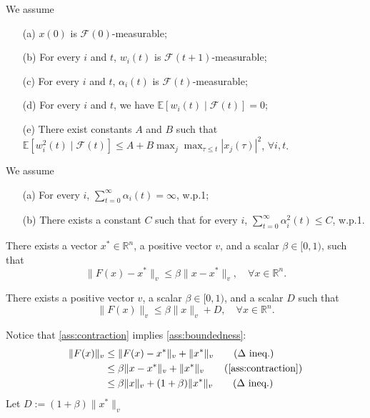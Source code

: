 \begin{assumption}\label{ass:stat}
We assume
    \begin{enumerate}
\item[(a)] $x(0)$ is $\mathcal{F}(0)$-measurable;
\item[(b)] For every $i$ and $t$, $w_i(t)$ is $\mathcal{F}(t+1)$-measurable;
\item[(c)] For every $i$ and $t$, $\alpha_i(t)$ is $\mathcal{F}(t)$-measurable;
\item[(d)] For every $i$ and $t$, we have $\mathbb{E}[w_i(t) \mid \mathcal{F}(t)] = 0$;
\item[(e)] There exist constants $A$ and $B$ such that
$\mathbb{E}[w_i^2(t) \mid \mathcal{F}(t)] \leq A + B \max_j \max_{\tau \leq t} |x_j(\tau)|^2$, $\forall i, t$.
\end{enumerate}
\end{assumption}
\begin{assumption}\label{ass:stepsize}
We assume
\begin{enumerate}
\item[(a)] For every $i$, $\sum_{t=0}^{\infty} \alpha_i(t) = \infty$, w.p.1;
\item[(b)] There exists a constant $C$ such that for every $i$, $\sum_{t=0}^{\infty} \alpha_i^2(t) \leq C$, w.p.1.
\end{enumerate}
    
\end{assumption}
\begin{assumption} [Contraction]\label{ass:contraction}
There exists a vector $x^* \in \mathbb{R}^n$, a positive vector $v$, and a scalar $\beta \in [0,1)$, such that
\begin{equation}
\|F(x) - x^*\|_v \leq \beta \|x - x^*\|_v, \quad \forall x \in \mathbb{R}^n.
\end{equation}
    
\end{assumption}

\begin{assumption}[Boundedness]\label{ass:boundedness}
    There exists a positive vector $v$, a scalar $\beta \in [0,1)$, and a scalar $D$ such that
\begin{equation}
\|F(x)\|_v \leq \beta\|x\|_v + D, \quad \forall x \in \mathbb{R}^n.
\end{equation}
\end{assumption}

\begin{remark}\label{rm:3implies4}
    Notice that \autoref{ass:contraction} implies \autoref{ass:boundedness}:
        \begin{align*}
        \|F(x)\|_v &\le \|F(x)-x^*\|_v + \|x^*\|_v\tag{$\Delta$ ineq.}\\
        &\le \beta \|x-x^*\|_v+\|x^*\|_v\tag{\autoref{ass:contraction}}\\
        &\le \beta\|x\|_v + (1+\beta) \|x^*\|_v\tag{$\Delta$ ineq.}
    \end{align*}
    Let $D:= (1+\beta)\|x^*\|_v$
\end{remark}
\newpage
